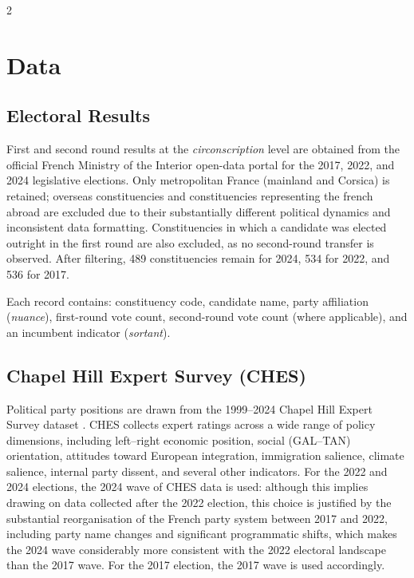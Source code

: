 \documentclass[10pt, a4paper]{article}
\begin{document}
\begin{multicols}{2}
\section{Data}
\label{sec:data}

\subsection{Electoral Results}

First and second round results at the \emph{circonscription} level are
obtained from the official French Ministry of the Interior open-data portal
for the 2017, 2022, and 2024 legislative elections.
Only metropolitan France (mainland and Corsica) is retained; overseas
constituencies and constituencies representing the french abroad are excluded due to their substantially different political
dynamics and inconsistent data formatting. Constituencies in which a candidate
was elected outright in the first round are also excluded, as no second-round
transfer is observed.
After filtering, 489 constituencies remain for 2024, 534 for
2022, and 536 for 2017.

Each record contains: constituency code, candidate name, party affiliation
(\emph{nuance}), first-round vote count, second-round vote count (where
applicable), and an incumbent indicator (\emph{sortant}).

\subsection{Chapel Hill Expert Survey (CHES)}

Political party positions are drawn from the 1999--2024 Chapel Hill Expert
Survey dataset \citep{ches2024}.
CHES collects expert ratings across a wide range of policy dimensions,
including left--right economic position, social (GAL--TAN) orientation,
attitudes toward European integration, immigration salience, climate salience,
internal party dissent, and several other indicators. For the 2022 and 2024
elections, the 2024 wave of CHES data is used: although this implies drawing
on data collected after the 2022 election, this choice is justified by the
substantial reorganisation of the French party system between 2017 and 2022,
including party name changes and significant programmatic shifts, which
makes the 2024 wave considerably more consistent with the 2022 electoral
landscape than the 2017 wave. For the 2017 election, the 2017 wave is used
accordingly.


\end{multicols}
\end{document}
